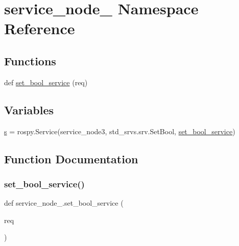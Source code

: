 \hypertarget{namespaceservice__node__3}{}\section{service\+\_\+node\+\_ Namespace Reference}
\label{namespaceservice__node__3}
\subsection*{Functions}
\begin{DoxyCompactItemize}
\item 
def \hyperlink{namespaceservice__node__3_affc7430f48ff995e3010d20ea9921473}{set\+\_\+bool\+\_\+service} (req)
\end{DoxyCompactItemize}
\subsection*{Variables}
\begin{DoxyCompactItemize}
\item 
\hyperlink{namespaceservice__node__3_aa976421a49e0b54f23833423400849ae}{s} = rospy.\+Service(\textquotesingle{}service\+\_\+node3\textquotesingle{}, std\+\_\+srvs.\+srv.\+Set\+Bool, \hyperlink{namespaceservice__node__3_affc7430f48ff995e3010d20ea9921473}{set\+\_\+bool\+\_\+service})
\end{DoxyCompactItemize}


\subsection{Function Documentation}
\mbox{\label{namespaceservice__node__3_affc7430f48ff995e3010d20ea9921473}} 
\subsubsection{\texorpdfstring{set\+\_\+bool\+\_\+service()}{set\_bool\_service()}}
{\footnotesize\ttfamily def service\+\_\+node\+\_.\+set\+\_\+bool\+\_\+service (\begin{DoxyParamCaption}\item[{}]{req }\end{DoxyParamCaption})}



